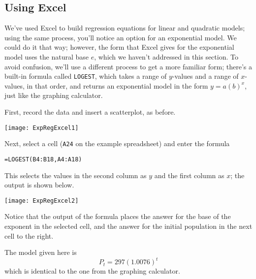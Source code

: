 \subsection{Using Excel}
We've used Excel to build regression equations for linear and quadratic models; using the same process, you'll notice an option for an exponential model.  We could do it that way; however, the form that Excel gives for the exponential model uses the natural base $e$, which we haven't addressed in this section.  To avoid confusion, we'll use a different process to get a more familiar form; there's a built-in formula called \texttt{LOGEST}, which takes a range of $y$-values and a range of $x$-values, in that order, and returns an exponential model in the form $y=a(b)^x$, just like the graphing calculator.

First, record the data and insert a scatterplot, as before.
\begin{center}
\texttt{[image: ExpRegExcel1]}
\end{center}

Next, select a cell (\texttt{A24} on the example spreadsheet) and enter the formula
\begin{center}
\texttt{=LOGEST(B4:B18,A4:A18)}
\end{center}
This selects the values in the second column as $y$ and the first column as $x$; the output is shown below.
\begin{center}
\texttt{[image: ExpRegExcel2]}
\end{center}

Notice that the output of the formula places the answer for the base of the exponent in the selected cell, and the answer for the initial population in the next cell to the right.

The model given here is 
\[P_t = 297(1.0076)^t\] which is identical to the one from the graphing calculator.